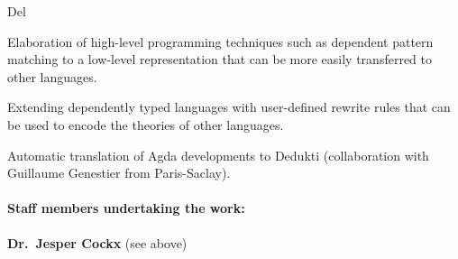 \begin{sitedescription}{Del}
\begin{compactitem}
\item Elaboration of high-level programming techniques such as
  dependent pattern matching to a low-level representation that can be
  more easily transferred to other languages.
\item Extending dependently typed languages with user-defined rewrite
  rules that can be used to encode the theories of other languages.
\item Automatic translation of Agda developments to Dedukti
  (collaboration with Guillaume Genestier from Paris-Saclay).
\end{compactitem}

\paragraph{Staff members undertaking the work:}

\textbf{Dr.\ Jesper Cockx} (see above)
\end{sitedescription}

